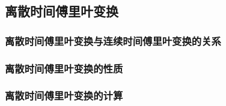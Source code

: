 \subsection{离散时间傅里叶变换}

\subsubsection{离散时间傅里叶变换与连续时间傅里叶变换的关系}

\subsubsection{离散时间傅里叶变换的性质}

\subsubsection{离散时间傅里叶变换的计算}
